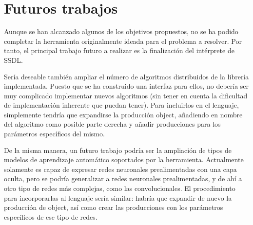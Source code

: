 \section{Futuros trabajos}

Aunque se han alcanzado algunos de los objetivos propuestos, no se ha podido completar la herramienta originalmente
ideada para el problema a resolver. Por tanto, el principal trabajo futuro a realizar es la finalización del intérprete
de SSDL.

\vspace{10pt}
Sería deseable también ampliar el número de algoritmos distribuidos de la librería implementada. Puesto que se ha 
construido una interfaz para ellos, no debería ser muy complicado implementar nuevos algoritmos (sin tener en cuenta la
dificultad de implementación inherente que puedan tener). Para incluirlos en el lenguaje, simplemente tendría que 
expandirse la producción \textlangle object\textrangle, añadiendo en nombre del algoritmo como posible parte derecha y
añadir producciones para los parámetros específicos del mismo.

\vspace{10pt}
De la misma manera, un futuro trabajo podría ser la ampliación de tipos de modelos de aprendizaje automático soportados
por la herramienta. Actualmente solamente es capaz de expresar redes neuronales prealimentadas con una capa oculta, pero
se podría generalizar a redes neuronales prealimentadas, y de ahí a otro tipo de redes más complejas, como las 
convolucionales. El procedimiento para incorporarlas al lenguaje sería similar: habría que expandir de nuevo la producción
de \textlangle object\textrangle, así como crear las producciones con los parámetros específicos de ese tipo de redes.

\endinput
